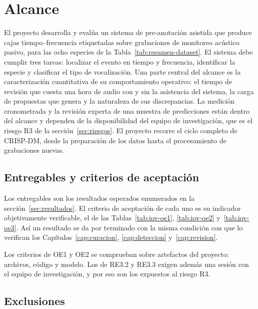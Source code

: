 \section{Alcance}

El proyecto desarrolla y evalúa un sistema de pre-anotación asistida que produce
cajas tiempo--frecuencia etiquetadas sobre grabaciones de monitoreo acústico
pasivo, para las ocho especies de la Tabla~\ref{tab:resumen-dataset}. El sistema debe
cumplir tres tareas: localizar el evento en tiempo y frecuencia, identificar la
especie y clasificar el tipo de vocalización. Una parte central del alcance es
la caracterización cuantitativa de su comportamiento operativo: el tiempo de
revisión que cuesta una hora de audio con y sin la asistencia del sistema, la
carga de propuestas que genera y la naturaleza de sus discrepancias. La medición
cronometrada y la revisión experta de una muestra de predicciones están dentro
del alcance y dependen de la disponibilidad del equipo de investigación, que es
el riesgo R3 de la sección~\ref{sec:riesgos}. El proyecto
recorre el ciclo completo de CRISP-DM, desde la preparación de los datos hasta el
procesamiento de grabaciones nuevas.

\subsection{Entregables y criterios de aceptación}

Los entregables son los resultados esperados enumerados en la
sección~\ref{sec:resultados}. El criterio de aceptación de cada uno es su
indicador objetivamente verificable, el de las Tablas~\ref{tab:iov-oe1},
\ref{tab:iov-oe2} y~\ref{tab:iov-oe3}. Así un resultado se da por terminado con
la misma condición con que lo verifican los
Capítulos~\ref{cap:curacion}, \ref{cap:deteccion} y~\ref{cap:revision}.

Los criterios de OE1 y OE2 se comprueban sobre artefactos del proyecto: archivos,
código y modelo. Los de RE3.2 y RE3.3 exigen además una sesión con el equipo de
investigación, y por eso son los expuestos al riesgo R3.

\subsection{Exclusiones}

